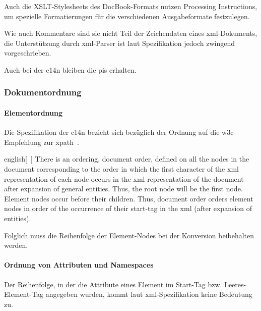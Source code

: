 Auch die XSLT-Stylesheets des DocBook-Formats nutzen Processing Instructions, um spezielle Formatierungen für die verschiedenen Ausgabeformate festzulegen.~\cite[{Kapitel \enquote{User Reference: PIs}}]{docbookxsl}

Wie auch Kommentare sind sie nicht Teil der Zeichendaten eines \acrshort{xml}-Dokuments, die Unterstützung durch \acrshort{xml}-Parser ist laut Spezifikation jedoch zwingend vorgeschrieben.

Auch bei der \acrlong{c14n} bleiben die \glspl{pi} erhalten.~\cite[Abschnitt 2.3]{boyer2001c14n}

\subsubsection{Dokumentordnung}

\paragraph{Elementordnung}

Die Spezifikation der \acrshort{c14n} bezieht sich bezüglich der Ordnung auf die \acrshort{w3c}-Empfehlung zur \acrfull{xpath}~\cite[Abschnitt~2.2]{boyer2001c14n}.

\begin{foreigndisplayquote}{english}[{~\cite[Abschnitt~5]{clark1999xpath1}}]
    There is an ordering, document order, defined on all the nodes in the document corresponding to the order in which the first character of the \acrshort{xml} representation of each node occurs in the \acrshort{xml} representation of the document after expansion of general entities. Thus, the root node will be the first node. Element nodes occur before their children. Thus, document order orders element nodes in order of the occurrence of their start-tag in the \acrshort{xml} (after expansion of entities).
\end{foreigndisplayquote}

Folglich muss die Reihenfolge der Element-Nodes bei der Konversion beibehalten werden.

\paragraph{Ordnung von Attributen und Namespaces}

Der Reihenfolge, in der die Attribute eines Element im Start-Tag bzw. Leeres-Element-Tag angegeben wurden, kommt laut \acrshort{xml}-Spezifikation keine Bedeutung zu.~\cite[Abschnitt~3.1]{maler2008xml}

